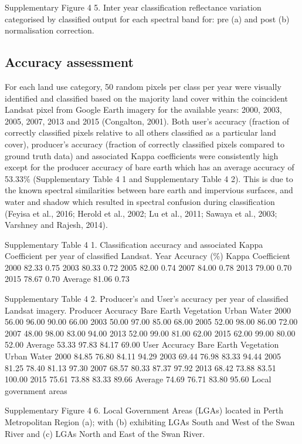 \documentclass[]{book}
\begin{document}
Supplementary Figure 4 5. Inter year classification reflectance
variation categorised by classified output for each spectral band for:
pre (a) and post (b) normalisation correction.

\subsection{Accuracy assessment}\label{accuracy-assessment}

For each land use category, 50 random pixels per class per year were
visually identified and classified based on the majority land cover
within the coincident Landsat pixel from Google Earth imagery for the
available years: 2000, 2003, 2005, 2007, 2013 and 2015 (Congalton,
2001). Both user's accuracy (fraction of correctly classified pixels
relative to all others classified as a particular land cover),
producer's accuracy (fraction of correctly classified pixels compared to
ground truth data) and associated Kappa coefficients were consistently
high except for the producer accuracy of bare earth which has an average
accuracy of 53.33\% (Supplementary Table 4 1 and Supplementary Table 4
2). This is due to the known spectral similarities between bare earth
and impervious surfaces, and water and shadow which resulted in spectral
confusion during classification (Feyisa et al., 2016; Herold et al.,
2002; Lu et al., 2011; Sawaya et al., 2003; Varshney and Rajesh, 2014).

Supplementary Table 4 1. Classification accuracy and associated Kappa
Coefficient per year of classified Landsat. Year Accuracy (\%) Kappa
Coefficient 2000 82.33 0.75 2003 80.33 0.72 2005 82.00 0.74 2007 84.00
0.78 2013 79.00 0.70 2015 78.67 0.70 Average 81.06 0.73

Supplementary Table 4 2. Producer's and User's accuracy per year of
classified Landsat imagery. Producer Accuracy Bare Earth Vegetation
Urban Water 2000 56.00 96.00 90.00 66.00 2003 50.00 97.00 85.00 68.00
2005 52.00 98.00 86.00 72.00 2007 48.00 98.00 83.00 94.00 2013 52.00
99.00 81.00 62.00 2015 62.00 99.00 80.00 52.00 Average 53.33 97.83 84.17
69.00 User Accuracy Bare Earth Vegetation Urban Water 2000 84.85 76.80
84.11 94.29 2003 69.44 76.98 83.33 94.44 2005 81.25 78.40 81.13 97.30
2007 68.57 80.33 87.37 97.92 2013 68.42 73.88 83.51 100.00 2015 75.61
73.88 83.33 89.66 Average 74.69 76.71 83.80 95.60 Local government areas

Supplementary Figure 4 6. Local Government Areas (LGAs) located in Perth
Metropolitan Region (a); with (b) exhibiting LGAs South and West of the
Swan River and (c) LGAs North and East of the Swan River.
\end{document}
